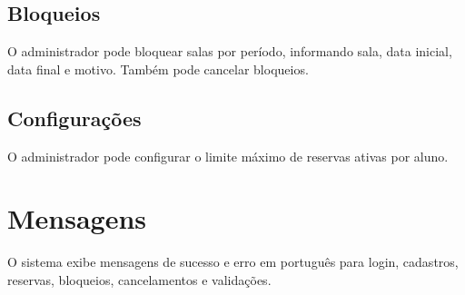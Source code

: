 \documentclass[12pt,a4paper]{article}
\begin{document}
\subsection{Bloqueios}
O administrador pode bloquear salas por período, informando sala, data inicial, data final e motivo. Também pode cancelar bloqueios.

\subsection{Configurações}
O administrador pode configurar o limite máximo de reservas ativas por aluno.

\section{Mensagens}
O sistema exibe mensagens de sucesso e erro em português para login, cadastros, reservas, bloqueios, cancelamentos e validações.
\end{document}

